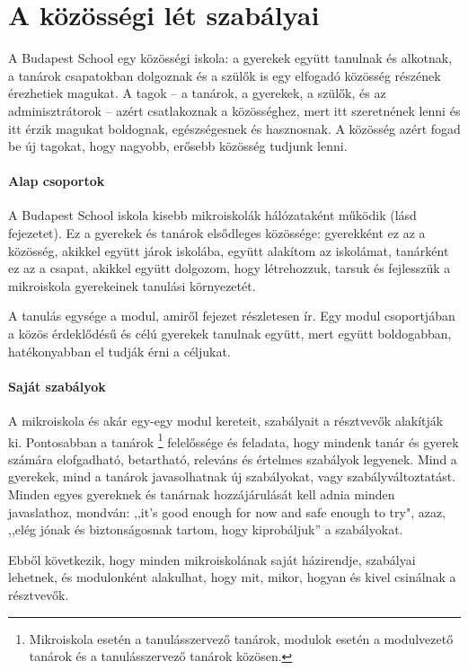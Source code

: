\section{A közösségi lét szabályai}
\label{sec:kozossegi_elet}
A Budapest School egy közösségi iskola: a gyerekek együtt tanulnak és alkotnak,
a tanárok
csapatokban dolgoznak és a szülők is egy elfogadó közösség részének érezhetiek
magukat. A tagok -- a tanárok, a gyerekek, a szülők,
és az adminisztrátorok -- azért csatlakoznak
a közösséghez, mert itt szeretnének lenni és itt érzik magukat boldognak,
egészségesnek és hasznosnak. A közösség azért fogad be új tagokat, hogy
nagyobb, erősebb közösség tudjunk lenni.

\paragraph{Alap csoportok} A Budapest School iskola kisebb mikroiskolák
hálózataként működik (lásd  fejezetet).
Ez a gyerekek és tanárok elsődleges közössége: gyerekként ez az a közösség,
akikkel együtt járok iskolába, együtt alakítom az iskolámat,
tanárként ez az a csapat, akikkel együtt dolgozom, hogy létrehozzuk, tarsuk és
fejlesszük a mikroiskola gyerekeinek tanulási környezetét.

A tanulás egysége a modul, amiről  fejezet részletesen ír.
Egy modul csoportjában a közös érdeklődésű és célú gyerekek tanulnak együtt,
mert együtt boldogabban, hatékonyabban el tudják érni a céljukat.

\paragraph{Saját szabályok}
\label{sec:sajat_szabalyok}
A mikroiskola és akár egy-egy modul kereteit,
szabályait a résztvevők alakítják ki. Pontosabban a tanárok
\footnote{Mikroiskola esetén a tanulásszervező tanárok, modulok
      esetén a modulvezető tanárok és a tanulásszervező tanárok közösen.}
felelőssége és
feladata, hogy mindenk tanár és gyerek számára elofgadható, betartható,
releváns és értelmes
szabályok
legyenek. Mind a gyerekek, mind a tanárok javasolhatnak új szabályokat, vagy
szabályváltoztatást. Minden egyes gyereknek és tanárnak hozzájárulását kell
adnia minden javaslathoz, mondván: ,,it's good enough for now and safe enough
to try", azaz, ,,elég jónak és biztonságosnak tartom, hogy kiprobáljuk'' a
szabályokat.

Ebből következik, hogy minden mikroiskolának saját házirendje, szabályai
lehetnek, és modulonként alakulhat, hogy mit, mikor, hogyan és kivel csinálnak
a résztvevők.

